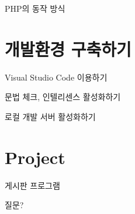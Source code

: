 \documentclass{beamer}
\begin{document}
    \begin{frame}{PHP의 동작 방식}

    \end{frame}

\section{개발환경 구축하기}
    \begin{frame}{Visual Studio Code 이용하기}

    \end{frame}

    \begin{frame}{문법 체크, 인텔리센스 활성화하기}

    \end{frame}

    \begin{frame}{로컬 개발 서버 활성화하기}

    \end{frame}

\section{Project}
    \begin{frame}{게시판 프로그램}

    \end{frame}

    \begin{frame}{질문?}

    \end{frame}
\end{document}
